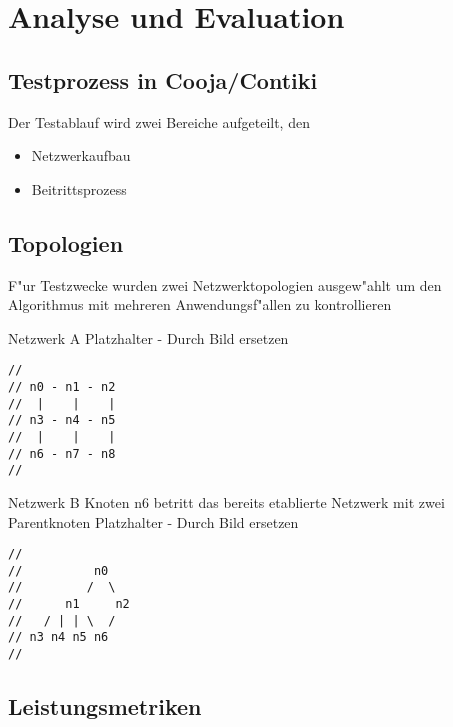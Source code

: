 \section{Analyse und Evaluation}
\label{sec:evaluation}


\subsection{Testprozess in Cooja/Contiki}
\label{subsec:ae_testprozess}

Der Testablauf wird zwei Bereiche aufgeteilt, den

\begin{itemize}
  \item Netzwerkaufbau
  \item Beitrittsprozess
\end{itemize}

\subsection{Topologien}
\label{subsec:ae_topologien}

F"ur Testzwecke wurden zwei Netzwerktopologien ausgew"ahlt um den Algorithmus mit
mehreren Anwendungsf"allen zu kontrollieren

Netzwerk A
Platzhalter - Durch Bild ersetzen
\begin{lstlisting}[frame=single]
//
// n0 - n1 - n2
//  |    |    |
// n3 - n4 - n5
//  |    |    |
// n6 - n7 - n8
//
\end{lstlisting}

Netzwerk B
Knoten n6 betritt das bereits etablierte Netzwerk mit zwei Parentknoten
Platzhalter - Durch Bild ersetzen
\begin{lstlisting}[frame=single]
//
//          n0
//         /  \
//      n1     n2
//   / | | \  /
// n3 n4 n5 n6
//
\end{lstlisting}

\subsection{Leistungsmetriken}
\label{subsec:ae_leistungsmetriken}


